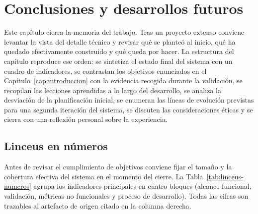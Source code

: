 
\chapter{Conclusiones y desarrollos futuros}\label{cap:conclusiones}

Este capítulo cierra la memoria del trabajo. Tras un proyecto extenso conviene levantar la vista del detalle técnico y revisar qué se planteó al inicio, qué ha quedado efectivamente construido y qué queda por hacer. La estructura del capítulo reproduce ese orden: se sintetiza el estado final del sistema con un cuadro de indicadores, se contrastan los objetivos enunciados en el Capítulo~\ref{cap:introduccion} con la evidencia recogida durante la validación, se recopilan las lecciones aprendidas a lo largo del desarrollo, se analiza la desviación de la planificación inicial, se enumeran las líneas de evolución previstas para una segunda iteración del sistema, se discuten las consideraciones éticas y se cierra con una reflexión personal sobre la experiencia.

\section{Linceus en números}\label{sec:linceus-numeros}

Antes de revisar el cumplimiento de objetivos conviene fijar el tamaño y la cobertura efectiva del sistema en el momento del cierre. La Tabla~\ref{tab:linceus-numeros} agrupa los indicadores principales en cuatro bloques (alcance funcional, validación, métricas no funcionales y proceso de desarrollo). Todas las cifras son trazables al artefacto de origen citado en la columna derecha.

